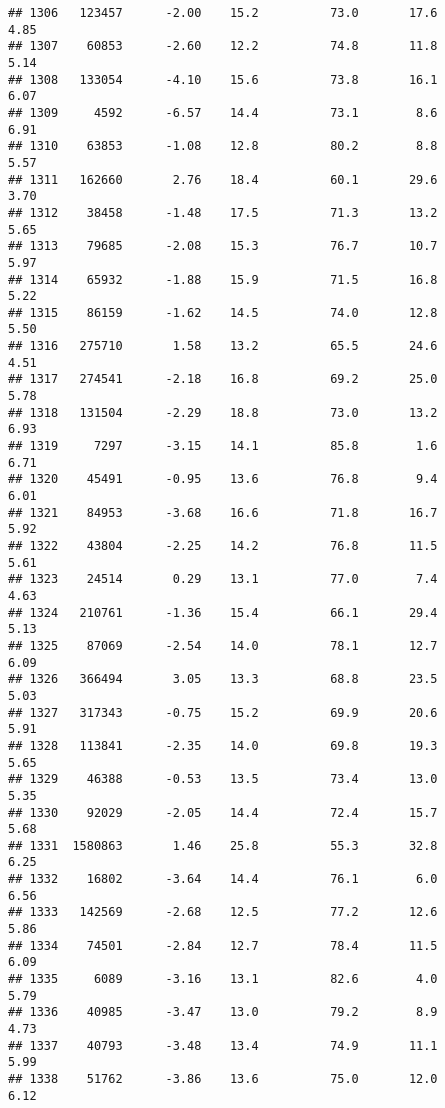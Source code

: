 \documentclass[
]{article}
\begin{document}
\begin{verbatim}
## 1306   123457      -2.00    15.2          73.0       17.6              4.85
## 1307    60853      -2.60    12.2          74.8       11.8              5.14
## 1308   133054      -4.10    15.6          73.8       16.1              6.07
## 1309     4592      -6.57    14.4          73.1        8.6              6.91
## 1310    63853      -1.08    12.8          80.2        8.8              5.57
## 1311   162660       2.76    18.4          60.1       29.6              3.70
## 1312    38458      -1.48    17.5          71.3       13.2              5.65
## 1313    79685      -2.08    15.3          76.7       10.7              5.97
## 1314    65932      -1.88    15.9          71.5       16.8              5.22
## 1315    86159      -1.62    14.5          74.0       12.8              5.50
## 1316   275710       1.58    13.2          65.5       24.6              4.51
## 1317   274541      -2.18    16.8          69.2       25.0              5.78
## 1318   131504      -2.29    18.8          73.0       13.2              6.93
## 1319     7297      -3.15    14.1          85.8        1.6              6.71
## 1320    45491      -0.95    13.6          76.8        9.4              6.01
## 1321    84953      -3.68    16.6          71.8       16.7              5.92
## 1322    43804      -2.25    14.2          76.8       11.5              5.61
## 1323    24514       0.29    13.1          77.0        7.4              4.63
## 1324   210761      -1.36    15.4          66.1       29.4              5.13
## 1325    87069      -2.54    14.0          78.1       12.7              6.09
## 1326   366494       3.05    13.3          68.8       23.5              5.03
## 1327   317343      -0.75    15.2          69.9       20.6              5.91
## 1328   113841      -2.35    14.0          69.8       19.3              5.65
## 1329    46388      -0.53    13.5          73.4       13.0              5.35
## 1330    92029      -2.05    14.4          72.4       15.7              5.68
## 1331  1580863       1.46    25.8          55.3       32.8              6.25
## 1332    16802      -3.64    14.4          76.1        6.0              6.56
## 1333   142569      -2.68    12.5          77.2       12.6              5.86
## 1334    74501      -2.84    12.7          78.4       11.5              6.09
## 1335     6089      -3.16    13.1          82.6        4.0              5.79
## 1336    40985      -3.47    13.0          79.2        8.9              4.73
## 1337    40793      -3.48    13.4          74.9       11.1              5.99
## 1338    51762      -3.86    13.6          75.0       12.0              6.12

\end{verbatim}
\end{document}
